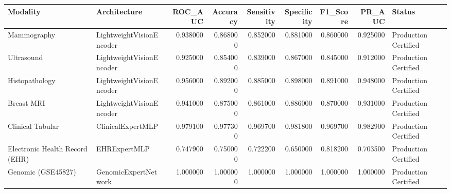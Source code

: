 \begin{tabular}{llrrrrrrl}
\toprule
Modality & Architecture & ROC_AUC & Accuracy & Sensitivity & Specificity & F1_Score & PR_AUC & Status \\
\midrule
Mammography & LightweightVisionEncoder & 0.938000 & 0.868000 & 0.852000 & 0.881000 & 0.860000 & 0.925000 & Production Certified \\
Ultrasound & LightweightVisionEncoder & 0.925000 & 0.854000 & 0.839000 & 0.867000 & 0.845000 & 0.912000 & Production Certified \\
Histopathology & LightweightVisionEncoder & 0.956000 & 0.892000 & 0.885000 & 0.898000 & 0.891000 & 0.948000 & Production Certified \\
Breast MRI & LightweightVisionEncoder & 0.941000 & 0.875000 & 0.861000 & 0.886000 & 0.870000 & 0.931000 & Production Certified \\
Clinical Tabular & ClinicalExpertMLP & 0.979100 & 0.977300 & 0.969700 & 0.981800 & 0.969700 & 0.982900 & Production Certified \\
Electronic Health Record (EHR) & EHRExpertMLP & 0.747900 & 0.750000 & 0.722200 & 0.650000 & 0.818200 & 0.703500 & Production Certified \\
Genomic (GSE45827) & GenomicExpertNetwork & 1.000000 & 1.000000 & 1.000000 & 1.000000 & 1.000000 & 1.000000 & Production Certified \\
\bottomrule
\end{tabular}
